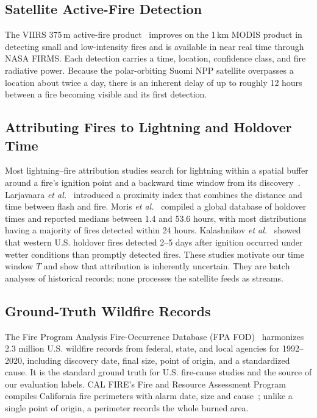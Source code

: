 \documentclass[10pt,journal,compsoc]{IEEEtran}
\begin{document}
\subsection{Satellite Active-Fire Detection}
The VIIRS 375\,m active-fire product~\cite{schroeder2014viirs} improves on the 1\,km MODIS product in detecting small and low-intensity fires and is available in near real time through NASA FIRMS. Each detection carries a time, location, confidence class, and fire radiative power. Because the polar-orbiting Suomi NPP satellite overpasses a location about twice a day, there is an inherent delay of up to roughly 12 hours between a fire becoming visible and its first detection.

\subsection{Attributing Fires to Lightning and Holdover Time}
Most lightning--fire attribution studies search for lightning within a spatial buffer around a fire's ignition point and a backward time window from its discovery~\cite{moris2023holdover}. Larjavaara \textit{et al.}~\cite{larjavaara2005finland} introduced a proximity index that combines the distance and time between flash and fire. Moris \textit{et al.}~\cite{moris2023holdover} compiled a global database of holdover times and reported medians between 1.4 and 53.6 hours, with most distributions having a majority of fires detected within 24 hours. Kalashnikov \textit{et al.}~\cite{kalashnikov2023liw} showed that western U.S. holdover fires detected 2--5 days after ignition occurred under wetter conditions than promptly detected fires. These studies motivate our time window $T$ and show that attribution is inherently uncertain. They are batch analyses of historical records; none processes the satellite feeds as streams.

\subsection{Ground-Truth Wildfire Records}
The Fire Program Analysis Fire-Occurrence Database (FPA FOD)~\cite{short2022fpafod} harmonizes 2.3 million U.S. wildfire records from federal, state, and local agencies for 1992--2020, including discovery date, final size, point of origin, and a standardized cause. It is the standard ground truth for U.S. fire-cause studies and the source of our evaluation labels. CAL FIRE's Fire and Resource Assessment Program compiles California fire perimeters with alarm date, size and cause~\cite{calfire2020perimeters}; unlike a single point of origin, a perimeter records the whole burned area.
\end{document}

